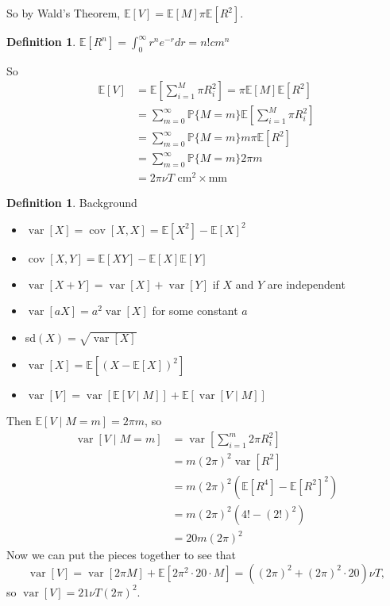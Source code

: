 \documentclass[12pt,letterpaper]{article}
\theoremstyle{definition}
\newtheorem{defn}[thm]{Definition}
\DeclareMathOperator{\var}{var}
\DeclareMathOperator{\cov}{cov}
\begin{document}
	So by Wald's Theorem, $\mathbb{E}[V] = \mathbb{E}[M]\pi \mathbb{E}[R^2]$. 
	
	\begin{defn}
		$\mathbb{E}[R^n] = \int_{0}^\infty r^ne^{-r}dr = n! cm^n$
	\end{defn}
	So \begin{align*}
	\mathbb{E}[V] &= \mathbb{E}\left[\sum_{i=1}^M \pi R^2_i\right] = \pi \mathbb{E}[M]\mathbb{E}[R^2]\\
	&= \sum_{m=0}^\infty \mathbb{P}\{M=m\}\mathbb{E}\left[\sum_{i=1}^M \pi R^2_i\right]\\
	&= \sum_{m=0}^\infty \mathbb{P}\{M=m\}m\pi \mathbb{E}[R^2] \\
	&= \sum_{m=0}^\infty \mathbb{P}\{M=m\}2\pi m\\
	&= 2\pi \nu T\text{ cm}^2 \times \text{mm}
	\end{align*} 
	
	\begin{defn} Background
		\begin{itemize}
			\item $\var[X] = \cov[X,X] = \mathbb{E}[X^2] - \mathbb{E}[X]^2$
			\item $\cov[X,Y] = \mathbb{E}[XY] - \mathbb{E}[X]\mathbb{E}[Y]$
			\item $\var[X+Y] = \var[X] + \var[Y]$ if $X$ and $Y$ are independent
			\item $\var[aX] = a^2\var[X]$ for some constant $a$
			\item sd$(X) = \sqrt{\var[X]}$
			\item $\var[X] = \mathbb{E}[(X - \mathbb{E}[X])^2]$
			\item $\var[V] = \var[\mathbb{E}[V\mid M]] + \mathbb{E}[\var[V\mid M]]$
		\end{itemize}
	\end{defn}

	Then $\mathbb{E}[V\mid M = m] = 2\pi m$, so 
	\begin{align*}
	\var[V \mid M = m] &= \var[\sum_{i=1}^m 2\pi R^2_i]\\
	&= m(2\pi)^2 \var[R^2]\\
	&= m(2\pi)^2 (\mathbb{E}[R^4] - \mathbb{E}[R^2]^2)\\
	&= m(2\pi)^2 (4! - (2!)^2) \\
	&= 20m(2\pi)^2
	\end{align*}
	Now we can put the pieces together to see that $$\var[V] = \var[2\pi M] + \mathbb{E}[2\pi^2 \cdot 20 \cdot M] = ((2\pi)^2 + (2\pi)^2\cdot 20)\nu T,$$ so $\var[V] = 21\nu T(2\pi)^2$. 
\end{document}
